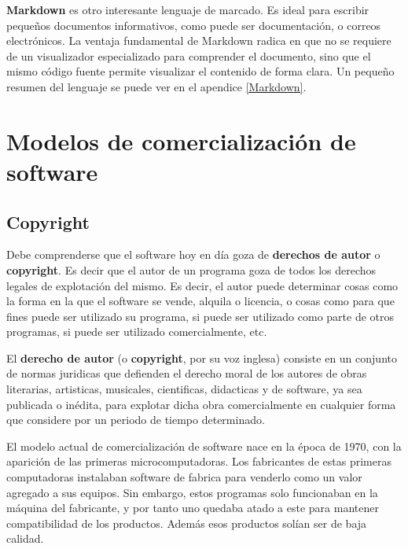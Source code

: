 \textbf{Markdown} es otro interesante lenguaje de marcado. Es ideal para escribir
pequeños documentos informativos, como puede ser documentación, o correos
electrónicos. La ventaja fundamental de Markdown radica en que no se requiere de
un visualizador especializado para comprender el documento, sino que el mismo
código fuente permite visualizar el contenido de forma clara. Un pequeño resumen
del lenguaje se puede ver en el apendice \ref{Markdown}.

\section{Modelos de comercialización de software}

\subsection{Copyright}

Debe comprenderse que el software hoy en día goza de \textbf{derechos
de autor} o \textbf{copyright}. Es decir que el autor de un programa goza de todos
los derechos legales de explotación del mismo. Es decir, el autor puede determinar
cosas como la forma en la que el software se vende, alquila o licencia, o cosas
como para que fines puede ser utilizado su programa, si puede ser utilizado como
parte de otros programas, si puede ser utilizado comercialmente, etc.

\begin{definition}
    El \textbf{derecho de autor} (o \textbf{copyright}, por su voz inglesa) consiste
    en un conjunto de normas juridicas que defienden el derecho moral de los autores
    de obras literarias, artisticas, musicales, cientificas, didacticas y de software,
    ya sea publicada o inédita, para explotar dicha obra comercialmente en cualquier
    forma que considere por un periodo de tiempo determinado.\autocite{oxford_copyright_2018}
\end{definition}

El modelo actual de comercialización de software nace en la época de 1970, con la
aparición de las primeras microcomputadoras. Los fabricantes de estas primeras
computadoras instalaban  software de fabrica para venderlo como un valor
agregado a sus equipos. Sin embargo, estos programas solo funcionaban en la
máquina del fabricante, y por tanto uno quedaba atado a este para mantener
compatibilidad de los productos. Además esos productos solían ser de baja calidad.

